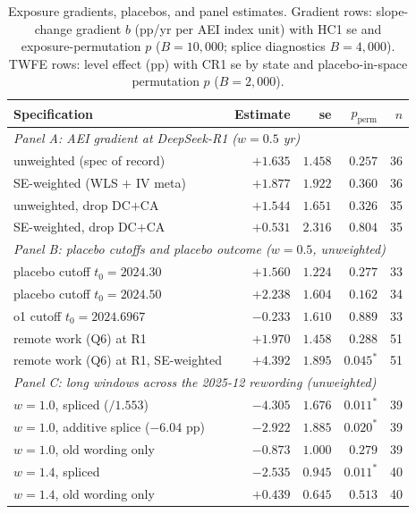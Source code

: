 \documentclass[11pt]{article}
\begin{document}
\begin{table}[t]
\centering
\scriptsize
\caption{Exposure gradients, placebos, and panel estimates. Gradient rows:
slope-change gradient $b$ (pp/yr per AEI index unit) with HC1 se and
exposure-permutation $p$ ($B=10{,}000$; splice diagnostics $B=4{,}000$).
TWFE rows: level effect (pp) with CR1 se by state and placebo-in-space
permutation $p$ ($B=2{,}000$).}
\label{tab:main}
\begin{tabular}{lrrrr}
\toprule
Specification & Estimate & se & $p_{\mathrm{perm}}$ & $n$ \\
\midrule
\multicolumn{5}{l}{\emph{Panel A: AEI gradient at DeepSeek-R1 ($w=0.5$ yr)}}\\
unweighted (spec of record)        & $+1.635$ & $1.458$ & $0.257$ & 36 \\
SE-weighted (WLS $+$ IV meta)      & $+1.877$ & $1.922$ & $0.360$ & 36 \\
unweighted, drop DC$+$CA           & $+1.544$ & $1.651$ & $0.326$ & 35 \\
SE-weighted, drop DC$+$CA          & $+0.531$ & $2.316$ & $0.804$ & 35 \\
\midrule
\multicolumn{5}{l}{\emph{Panel B: placebo cutoffs and placebo outcome ($w=0.5$, unweighted)}}\\
placebo cutoff $t_0=2024.30$       & $+1.560$ & $1.224$ & $0.277$ & 33 \\
placebo cutoff $t_0=2024.50$       & $+2.238$ & $1.604$ & $0.162$ & 34 \\
o1 cutoff $t_0=2024.6967$          & $-0.233$ & $1.610$ & $0.889$ & 33 \\
remote work (Q6) at R1             & $+1.970$ & $1.458$ & $0.288$ & 51 \\
remote work (Q6) at R1, SE-weighted & $+4.392$ & $1.895$ & $0.045^{\ast}$ & 51 \\
\midrule
\multicolumn{5}{l}{\emph{Panel C: long windows across the 2025-12 rewording (unweighted)}}\\
$w=1.0$, spliced ($/1.553$)        & $-4.305$ & $1.676$ & $0.011^{\ast}$ & 39 \\
$w=1.0$, additive splice ($-6.04$ pp) & $-2.922$ & $1.885$ & $0.020^{\ast}$ & 39 \\
$w=1.0$, old wording only          & $-0.873$ & $1.000$ & $0.279$ & 39 \\
$w=1.4$, spliced                   & $-2.535$ & $0.945$ & $0.011^{\ast}$ & 40 \\
$w=1.4$, old wording only          & $+0.439$ & $0.645$ & $0.513$ & 40 \\

\end{tabular}
\end{table}
\end{document}
